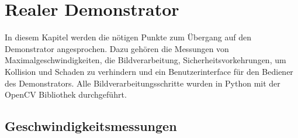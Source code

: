 \chapter{Realer Demonstrator}  
\label{ch:realer demonstrator}
In diesem Kapitel werden die nötigen Punkte zum Übergang auf den Demonstrator angesprochen. Dazu gehören die Messungen von Maximalgeschwindigkeiten, die Bildverarbeitung, Sicherheitsvorkehrungen, um Kollision und Schaden zu verhindern und ein Benutzerinterface für den Bediener des Demonstrators. Alle Bildverarbeitungsschritte wurden in Python mit der OpenCV Bibliothek durchgeführt.

\section{Geschwindigkeitsmessungen}
\label{sect:geschwindigkeitsmessungen}

